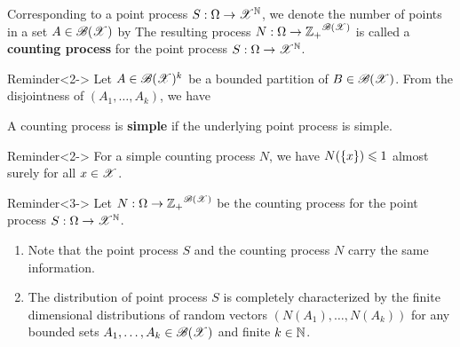 \documentclass[12pt,aspectratio=169]{beamer}
\begin{document}
\begin{frame}
\begin{Definition}
Corresponding to a point process $S:\Omega\to\mathscr{X}^{\mathbb{N}}$, 
we denote the number of points in a set $A \in \mathscr{B}(\mathscr{X})$ by
The resulting process $N: \Omega \to {\mathbb{Z}_+}^ {\mathscr{B}(\mathscr{X})}$ is called a \textbf{counting process} for the point process $S: \Omega \to \mathscr{X}^{\mathbb{N}}$. 
\end{Definition} 
\begin{block}{Reminder}<2->
Let $A \in \mathscr{B}(\mathscr{X})^k$ be a bounded partition of $B\in \mathscr{B}(\mathscr{X})$. 
From the disjointness of $(A_1, \dots, A_k)$, we have 
\end{block}
\end{frame}

\begin{frame}
\begin{Definition} 
A counting process is \textbf{simple} if the underlying point process is simple. %
\end{Definition}
\begin{block}{Reminder}<2->
For a simple counting process $N$, we have $N(\left\{x\right\}) \leqslant 1$ almost surely for all $x \in \mathscr{X}$.
\end{block}
\begin{block}{Reminder}<3->
Let $N : \Omega \to {\mathbb{Z}_+}^{\mathscr{B}(\mathscr{X})}$ be the counting process for the point process $S: \Omega \to \mathscr{X}^{\mathbb{N}}$.  
\begin{enumerate}[i\_]
\item Note that the point process $S$ and the counting process $N$ carry the same information. 
\item The distribution of point process $S$ is completely characterized by the finite dimensional distributions of random vectors $(N(A_1), \dots, N(A_k))$ for any bounded sets $A_1, \dots, A_k \in \mathscr{B}(\mathscr{X})$ and finite $k \in \mathbb{N}$.  
\end{enumerate}
\end{block}
\end{frame}
\end{document}
